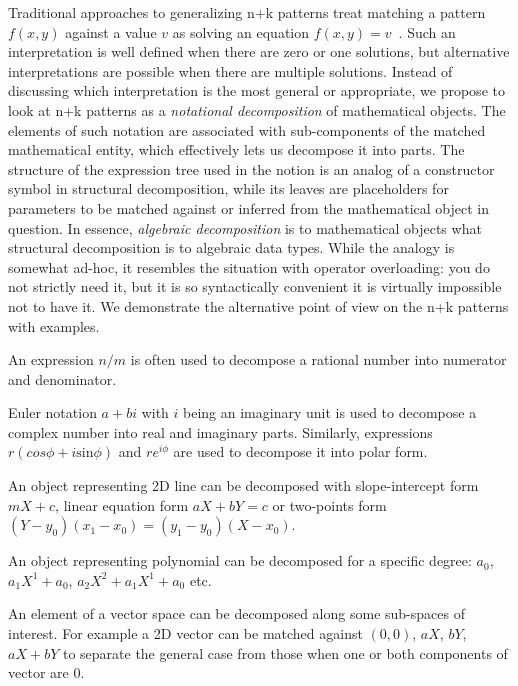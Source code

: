 Traditional approaches to generalizing n+k patterns treat matching a pattern 
$f(x,y)$ against a value $v$ as solving an equation $f(x,y)=v$~\cite{OosterhofThesis}. 
Such an interpretation is well defined when there are zero or one solutions,
but alternative interpretations are possible when there are multiple solutions. 
Instead of discussing which interpretation is the most general or appropriate, 
we propose to look at n+k patterns as a \emph{notational decomposition} of 
mathematical objects. The elements of such notation are associated with 
sub-components of the matched mathematical entity, which effectively lets us 
decompose it into parts. The structure of the expression tree used in the notion
is an analog of a constructor symbol in structural decomposition, while its 
leaves are placeholders for parameters to be matched against or inferred from 
the mathematical object in question. In essence, \emph{algebraic decomposition} 
is to mathematical objects what structural decomposition is to algebraic data 
types. While the analogy is somewhat ad-hoc, it resembles the situation with 
operator overloading: you do not strictly need it, but it is so syntactically 
convenient it is virtually impossible not to have it. We demonstrate the 
alternative point of view on the n+k patterns with examples.

\begin{compactitem}
\setlength{\itemsep}{0pt}
\setlength{\parskip}{0pt}
\item An expression $n/m$ is often used to decompose a rational number into 
      numerator and denominator.
\item Euler notation $a+bi$ with $i$ being an imaginary unit is used to 
      decompose a complex number into real and imaginary parts. Similarly, 
      expressions $r(cos \phi + i\mathrm{sin} \phi)$ and $re^{i\phi}$ are used to 
      decompose it into polar form.
\item An object representing 2D line can be decomposed with slope-intercept form 
      $mX+c$, linear equation form $aX+bY=c$ or two-points form 
      $(Y-y_0)(x_1-x_0)=(y_1-y_0)(X-x_0)$.
\item An object representing polynomial can be decomposed for a specific degree: 
      $a_0$, $a_1X^1+a_0$, $a_2X^2+a_1X^1+a_0$ etc.
\item An element of a vector space can be decomposed along some sub-spaces of 
      interest. For example a 2D vector can be matched against $(0,0)$, $aX$, 
      $bY$, $aX+bY$ to separate the general case from those when one or both
      components of vector are $0$.
\end{compactitem}

